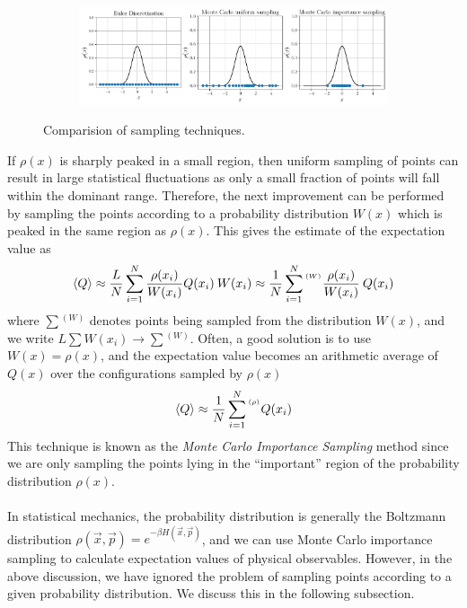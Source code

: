 \documentclass[../thesis_main.tex]{subfiles}
\begin{document}
\begin{figure}[!htb]
    \centering
    \begin{subfigure}[b]{1.0\textwidth}  %
        \centering
        \includegraphics[width=\textwidth]{images/monte_carlo/sampling.pdf}
    \end{subfigure}
    \caption{Comparision of sampling techniques.}
    \label{}
\end{figure}
\FloatBarrier \!\!\!\!\!\!\!\!\!\!\!
If $\rho(x)$ is sharply peaked in a small region, then uniform sampling of points can result in large statistical fluctuations as only a small fraction of points will fall within the dominant range. Therefore, the next improvement can be performed by sampling the points according to a probability distribution $W(x)$ which is peaked in the same region as $\rho(x)$. This gives the estimate of the expectation value as 
\begin{equation}
    \expval{Q} \approx \frac{L}{N} \sum_{i=1}^N \frac{\rho(x_i)}{W(x_i)} Q(x_i) \: W(x_i) \approx \frac{1}{N} \sum_{i=1}^N {}^{{}^{(W)}} \frac{\rho(x_i)}{W(x_i)} \: Q(x_i)
\end{equation}  
where $\sum {}^{(W)}$ denotes points being sampled from the distribution $W(x)$, and we write $L \sum W(x_i) \to \sum {{}^{(W)}}$. Often, a good solution is to use $W(x) = \rho(x)$, and the expectation value becomes an arithmetic average of $Q(x)$ over the configurations sampled by $\rho(x)$
\begin{equation}
    \expval{Q} \approx \frac{1}{N} \sum_{i=1}^N {}^{{}^{(\rho)}} Q(x_i)
\end{equation}
This technique is known as the \textit{Monte Carlo Importance Sampling} method since we are only sampling the points lying in the ``important'' region of the probability distribution $\rho(x)$.~\\~\\
In statistical mechanics, the probability distribution is generally the Boltzmann distribution $\rho(\vec{x}, \vec{p}) = e^{-\beta H (\vec{x},\vec{p})}$, and we can use Monte Carlo importance sampling to calculate expectation values of physical observables. However, in the above discussion, we have ignored the problem of sampling points according to a given probability distribution. We discuss this in the following subsection.
\end{document}
